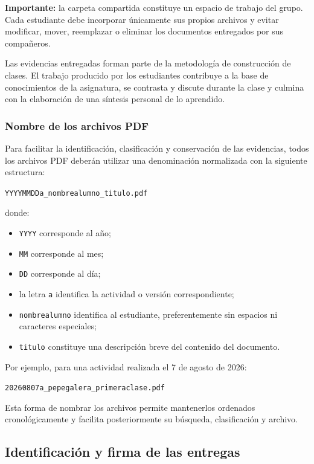 \documentclass[12pt,a4paper]{article}
\begin{document}
\textbf{Importante:} la carpeta compartida constituye un espacio de trabajo del grupo. Cada estudiante debe incorporar únicamente sus propios archivos y evitar modificar, mover, reemplazar o eliminar los documentos entregados por sus compañeros.

Las evidencias entregadas forman parte de la metodología de construcción de clases. El trabajo producido por los estudiantes contribuye a la base de conocimientos de la asignatura, se contrasta y discute durante la clase y culmina con la elaboración de una síntesis personal de lo aprendido.

\subsubsection{Nombre de los archivos PDF}

Para facilitar la identificación, clasificación y conservación de las evidencias, todos los archivos PDF deberán utilizar una denominación normalizada con la siguiente estructura:

\begin{center}
\texttt{YYYYMMDDa\_nombrealumno\_titulo.pdf}
\end{center}

donde:

\begin{itemize}
\item \texttt{YYYY} corresponde al año;
\item \texttt{MM} corresponde al mes;
\item \texttt{DD} corresponde al día;
\item la letra \texttt{a} identifica la actividad o versión correspondiente;
\item \texttt{nombrealumno} identifica al estudiante, preferentemente sin espacios ni caracteres especiales;
\item \texttt{titulo} constituye una descripción breve del contenido del documento.
\end{itemize}

Por ejemplo, para una actividad realizada el 7 de agosto de 2026:

\begin{center}
\texttt{20260807a\_pepegalera\_primeraclase.pdf}
\end{center}

Esta forma de nombrar los archivos permite mantenerlos ordenados cronológicamente y facilita posteriormente su búsqueda, clasificación y archivo.

\subsection{Identificación y firma de las entregas}
\end{document}
